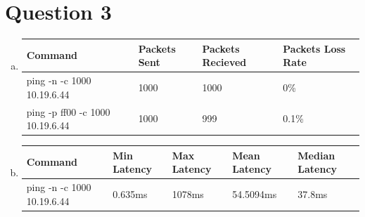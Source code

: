 \documentclass[a4paper,10pt]{article}
\begin{document}
\section*{Question 3}
\begin{enumerate}[a)]
	\item
	\begin{tabularx}{0.95\textwidth}{|p{130pt}||X||X||X|}
		\hline
		\rowcolor{cyan!40}
		\textbf{Command} & \textbf{Packets Sent} & \textbf{Packets Recieved} & \textbf{Packets Loss Rate} \\ \hline
		 ping -n -c 1000 10.19.6.44 & 1000 & 1000 & 0\%\\ \hline
		ping -p ff00 -c 1000 10.19.6.44 & 1000 & 999  &0.1\% \\ \hline
	\end{tabularx}
	\item 
	\begin{tabularx}{0.95\textwidth}{|p{130pt}||X||X||X||p{90pt}|}
		\hline
		\rowcolor{cyan!40}
		\textbf{Command} & \textbf{Min Latency} & \textbf{Max Latency} & \textbf{Mean Latency} & \textbf{Median Latency} \\ \hline
		ping -n -c 1000 10.19.6.44 & 0.635ms & 1078ms & 54.5094ms & 37.8ms \\ \hline
		

\end{tabularx}
\end{enumerate}
\end{document}
